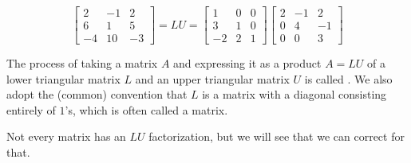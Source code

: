 \documentclass{ximera}
\begin{document}
$$\begin{bmatrix}2&-1&2\\6&1&5\\-4&10&-3\end{bmatrix}=LU=\begin{bmatrix}1&0&0\\3&1&0\\-2&2&1\end{bmatrix}\begin{bmatrix}2&-1&2\\0&4&-1\\0&0&3\end{bmatrix}$$
 
The process of taking a matrix $A$ and expressing it as a product $A=LU$ of a lower triangular matrix $L$ and an upper triangular matrix $U$ is called .
We also adopt the (common) convention that $L$ is a matrix with a diagonal consisting entirely of $1$'s, which is often called a  matrix.
 
Not every matrix has an $LU$ factorization, but we will see that we can correct for that.
 
\end{document}
